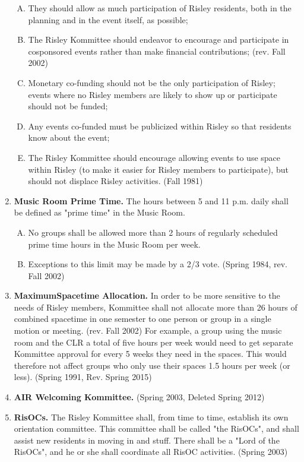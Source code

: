 \documentclass[12pt]{article}
\begin{document}
\begin{enumerate}[1.]
\begin{enumerate}[A.]
\item They should allow as much participation of Risley residents, both in the planning and in the event itself, as possible; 
\item The Risley Kommittee should endeavor to encourage and participate in cosponsored events rather than make financial contributions; (rev. Fall 2002) 
\item Monetary co-funding should not be the only participation of Risley; events where no Risley members are likely to show up or participate should not be funded; 
\item Any events co-funded must be publicized within Risley so that residents know about the event; 
\item The Risley Kommittee should encourage allowing events to use space within Risley (to make it easier for Risley members to participate), but should not displace Risley activities. (Fall 1981)
\end{enumerate}
\item \textbf{Music Room Prime Time.} The hours between 5 and 11 p.m. daily shall be defined as "prime time" in the Music Room.
\begin{enumerate}[A.]
\item No groups shall be allowed more than 2 hours of regularly scheduled prime time hours in the Music Room per week. 
\item Exceptions to this limit may be made by a 2/3 vote. (Spring 1984, rev. Fall 2002)
\end{enumerate}
\item \textbf{MaximumSpacetime Allocation.} In order to be more sensitive to the needs of Risley members, Kommittee shall not allocate more than 26 hours of combined spacetime in one semester to one person or group in a single motion or meeting. (rev. Fall 2002) For example, a group using the music room and the CLR a total of five hours per week would need to get separate Kommittee approval for every 5 weeks they need in the spaces. This would therefore not affect groups who only use their spaces 1.5 hours per week (or less). (Spring 1991, Rev. Spring 2015)
\item \textbf{AIR Welcoming Kommittee.} (Spring 2003, Deleted Spring 2012)
\item \textbf{RisOCs.} The Risley Kommittee shall, from time to time, establish its own orientation committee. This committee shall be called "the RisOCs", and shall assist new residents in moving in and stuff. There shall be a "Lord of the RisOCs", and he or she shall coordinate all RisOC activities. (Spring 2003)

\end{enumerate}
\end{document}
